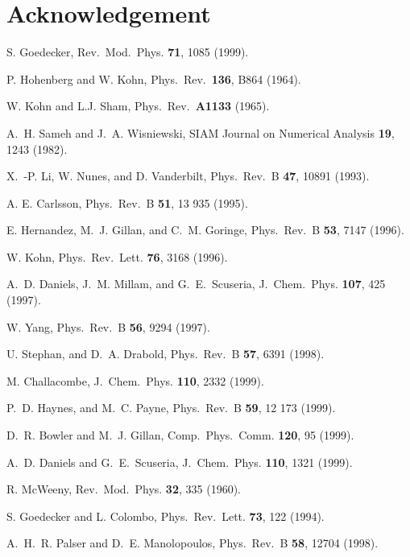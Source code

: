 \section{Acknowledgement}

\begin{references}

 S. Goedecker,
Rev.\ Mod.\ Phys. {\bf 71}, 1085 (1999).

 P. Hohenberg and W. Kohn,
Phys.\ Rev.\ {\bf 136}, B864 (1964).

 W. Kohn and L.J. Sham,
Phys.\ Rev.\ {\bf A1133} (1965).

  A.\ H. Sameh and J.\ A. Wisniewski,
SIAM Journal on Numerical Analysis {\bf 19}, 1243 (1982).

 X.\ -P. Li, W. Nunes, and D. Vanderbilt,
Phys.\ Rev.\ B {\bf 47}, 10891 (1993).

 A. E. Carlsson,
Phys.\ Rev.\ B {\bf 51}, 13 935 (1995).

 E. Hernandez, M.\ J. Gillan, and C.\ M. Goringe,
Phys.\ Rev.\ B {\bf 53}, 7147 (1996).

 W. Kohn,
Phys.\ Rev.\ Lett. {\bf 76}, 3168 (1996).

 A.\ D. Daniels, J.\ M. Millam, and G.\ E.\ Scuseria,
J.\ Chem.\ Phys. {\bf 107}, 425 (1997).

 W. Yang,
Phys.\ Rev.\ B {\bf 56}, 9294 (1997).

 U. Stephan, and D.\ A. Drabold,
Phys.\ Rev.\ B {\bf 57}, 6391 (1998).

 M. Challacombe,
J.\ Chem.\ Phys. {\bf 110}, 2332 (1999).

 P.\ D. Haynes, and M.\ C. Payne,
Phys.\ Rev.\ B {\bf 59}, 12 173 (1999).

 D.\ R. Bowler and M.\ J. Gillan,
Comp.\ Phys.\ Comm. {\bf 120}, 95 (1999).

 A.\ D. Daniels and G.\ E.\ Scuseria,
J.\ Chem.\ Phys. {\bf 110}, 1321 (1999).

 R. McWeeny,
Rev.\ Mod.\ Phys. {\bf 32}, 335 (1960).

 S. Goedecker and L. Colombo,
Phys.\ Rev.\ Lett. {\bf 73}, 122 (1994).

 A.\ H.\ R. Palser and D.\ E. Manolopoulos,
Phys.\ Rev.\ B {\bf 58}, 12704 (1998). 


\end{references}
